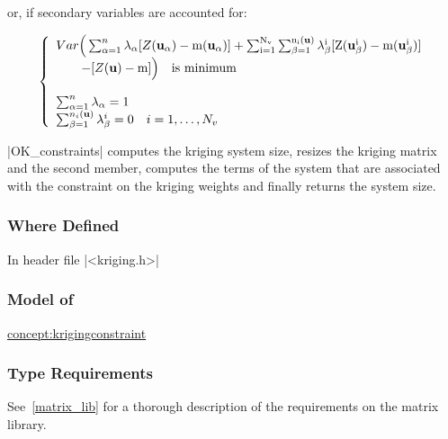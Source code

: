 \documentclass[12pt,twoside]{report}
\newcommand{\mloc}[1]{\rm{\bf #1}}
\begin{document}
\noindent or, if secondary variables are accounted for:

\begin{displaymath}
  \left\{ \begin{array}{l}
      Var \Big( \sum_{\alpha=1}^{n} \lambda_{\alpha} [Z(\mloc{u}_{\alpha})-m(\mloc{u}_{\alpha})] + \sum_{i=1}^{N_v} \sum_{\beta=1}^{n_i(\mloc{u})}\lambda_{\beta}^i [Z(\mloc{u}_{\beta}^i)-m(\mloc{u}_{\beta}^i)] \\ \qquad - [Z(\mloc{u})-m] \Big) \quad \textrm{is minimum} \\ \\
      
      \sum_{\alpha=1}^{n} \lambda_{\alpha} =1 \\
 \sum_{\beta=1}^{n_i(\mloc{u})}\lambda_{\beta}^i =0 \quad i=1,\ldots,N_v
    \end{array} \right.
\end{displaymath}

|OK_constraints| computes the kriging system size, resizes the kriging matrix and the second member, computes the terms of the system that are associated with the constraint on the kriging weights and finally returns the system size.


\htmlrule[CLEAR=all]  \subsubsection*{Where Defined}
In header file |<kriging.h>|


\htmlrule[CLEAR=all]  \subsubsection*{Model of}
\hyperref{Kriging Constraint}{Kriging Constraint}{}{concept:krigingconstraint}

\htmlrule[CLEAR=all]  \subsubsection*{Type Requirements}
See~\ref{matrix_lib} for a thorough description of the requirements on the matrix library.
\end{document}

